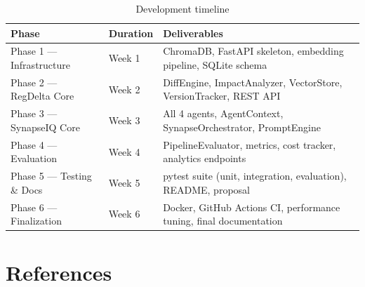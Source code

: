 \documentclass[12pt,letterpaper]{article}
\begin{document}
\begin{table}[h!]
\centering
\begin{tabular}{L{3.5cm} C{1.8cm} L{8.0cm}}
\toprule
\textbf{Phase} & \textbf{Duration} & \textbf{Deliverables} \\
\midrule
Phase 1 --- Infrastructure & Week 1 & ChromaDB, FastAPI skeleton, embedding pipeline, SQLite schema \\
Phase 2 --- RegDelta Core  & Week 2 & DiffEngine, ImpactAnalyzer, VectorStore, VersionTracker, REST API \\
Phase 3 --- SynapseIQ Core & Week 3 & All 4 agents, AgentContext, SynapseOrchestrator, PromptEngine \\
Phase 4 --- Evaluation     & Week 4 & PipelineEvaluator, metrics, cost tracker, analytics endpoints \\
Phase 5 --- Testing \& Docs & Week 5 & pytest suite (unit, integration, evaluation), README, proposal \\
Phase 6 --- Finalization   & Week 6 & Docker, GitHub Actions CI, performance tuning, final documentation \\
\bottomrule
\end{tabular}
\caption{Development timeline}
\end{table}

\section{References}
\end{document}
